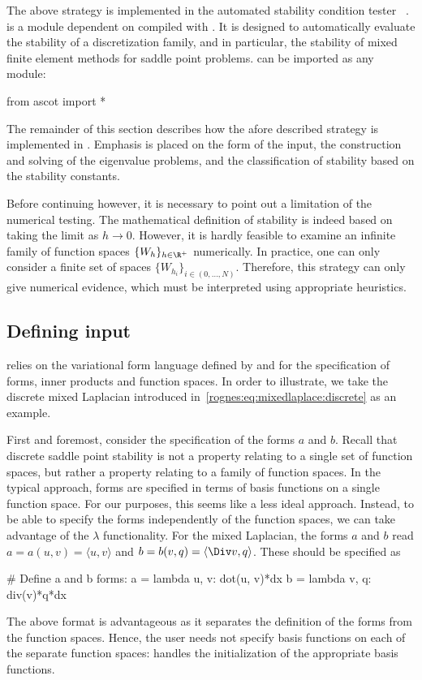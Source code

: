 The above strategy is implemented in the automated stability condition
tester \rognesascot{}~\citep{Rognes2009}. \rognesascot{} is a
\rognespython{} module dependent on \pydolfin{} compiled with
\slepc{}. It is designed to automatically evaluate the stability of a
discretization family, and in particular, the stability of mixed
finite element methods for saddle point problems. \rognesascot{} can
be imported as any \rognespython{} module:
\begin{python}
  from ascot import *
\end{python}
The remainder of this section describes how the afore described
strategy is implemented in \rognesascot{}. Emphasis is placed on the form of
the input, the construction and solving of the eigenvalue problems,
and the classification of stability based on the stability constants.

Before continuing however, it is necessary to point out a limitation
of the numerical testing. The mathematical definition of stability is
indeed based on taking the limit as $h \rightarrow 0$. However, it is
hardly feasible to examine an infinite family of function spaces
$\{W_h\}_{h \in \R^{+}}$ numerically. In practice, one can only
consider a finite set of spaces $\{W_{h_i}\}_{i \in (0, \dots,
  N)}$. Therefore, this strategy can only give numerical evidence,
which must be interpreted using appropriate heuristics.

\subsection{Defining input}
\label{rognes:subsec:input}

\rognesascot{} relies on the variational form language defined by \ufl{} and
\pydolfin{} for the specification of forms, inner products and
function spaces.  In order to illustrate, we take the discrete mixed
Laplacian introduced in~\eqref{rognes:eq:mixedlaplace:discrete} as an
example.

First and foremost, consider the specification of the forms $a$ and
$b$. Recall that discrete saddle point stability is not a property
relating to a single set of function spaces, but rather a property
relating to a family of function spaces. In the typical \pydolfin{}
approach, forms are specified in terms of basis functions on a single
function space. For our purposes, this seems like a less ideal
approach. Instead, to be able to specify the forms independently of
the function spaces, we can take advantage of the \rognespython{}
$\lambda$ functionality. For the mixed Laplacian, the forms $a$ and
$b$ read $a = a(u, v) = \langle u, v \rangle$ and $b = b(v, q) =
\langle \Div v, q \rangle$. These should be specified as
\begin{python}
  # Define a and b forms:
  a = lambda u, v: dot(u, v)*dx
  b = lambda v, q: div(v)*q*dx
\end{python}
The above format is advantageous as it separates the definition of the
forms from the function spaces. Hence, the user needs not specify
basis functions on each of the separate function spaces: \rognesascot{}
handles the initialization of the appropriate basis functions.


